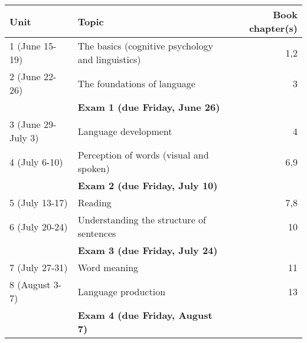 \documentclass[10pt]{article}
\begin{document}
\begin{center}
\begin{tabular}{llr}
Unit & Topic & Book chapter(s)\\
\hline
1 (June 15-19) & The basics (cognitive psychology and linguistics) & 1,2\\
2 (June 22-26) & The foundations of language & 3\\
 & \textbf{Exam 1 (due Friday, June 26)} & \\
3 (June 29-July 3) & Language development & 4\\
4 (July 6-10) & Perception of words (visual and spoken) & 6,9\\
 & \textbf{Exam 2 (due Friday, July 10)} & \\
5 (July 13-17) & Reading & 7,8\\
6 (July 20-24) & Understanding the structure of sentences & 10\\
 & \textbf{Exam 3 (due Friday, July 24)} & \\
7 (July 27-31) & Word meaning & 11\\
8 (August 3-7) & Language production & 13\\
 & \textbf{Exam 4 (due Friday, August 7)} & \\
\end{tabular}
\end{center}
\end{document}
